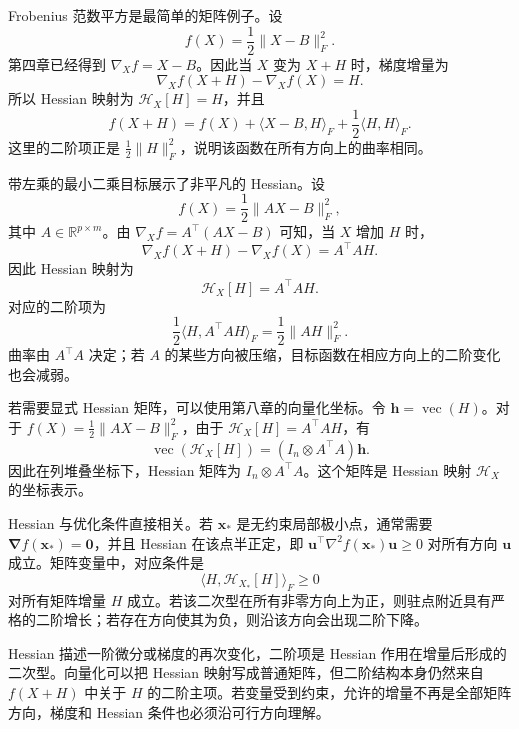 Frobenius 范数平方是最简单的矩阵例子。设
\[
f(X)=\frac12\|X-B\|_F^2.
\]
第四章已经得到 \(\nabla_X f=X-B\)。因此当 \(X\) 变为 \(X+H\) 时，梯度增量为
\[
\nabla_X f(X+H)-\nabla_X f(X)=H.
\]
所以 Hessian 映射为 \(\mathcal{H}_X[H]=H\)，并且
\[
f(X+H)=f(X)+\langle X-B,H\rangle_F+\frac12\langle H,H\rangle_F.
\]
这里的二阶项正是 \(\frac12\|H\|_F^2\)，说明该函数在所有方向上的曲率相同。

带左乘的最小二乘目标展示了非平凡的 Hessian。设
\[
f(X)=\frac12\|AX-B\|_F^2,
\]
其中 \(A\in\mathbb{R}^{p\times m}\)。由 \(\nabla_X f=A^\top(AX-B)\) 可知，当 \(X\) 增加 \(H\) 时，
\[
\nabla_X f(X+H)-\nabla_X f(X)=A^\top A H.
\]
因此 Hessian 映射为
\[
\mathcal{H}_X[H]=A^\top A H.
\]
对应的二阶项为
\[
\frac12\langle H,A^\top A H\rangle_F=\frac12\|AH\|_F^2.
\]
曲率由 \(A^\top A\) 决定；若 \(A\) 的某些方向被压缩，目标函数在相应方向上的二阶变化也会减弱。

若需要显式 Hessian 矩阵，可以使用第八章的向量化坐标。令 \(\bm{h}=\operatorname{vec}(H)\)。对于 \(f(X)=\frac12\|AX-B\|_F^2\)，由于 \(\mathcal{H}_X[H]=A^\top A H\)，有
\[
\operatorname{vec}(\mathcal{H}_X[H])=(I_n\otimes A^\top A)\bm{h}.
\]
因此在列堆叠坐标下，Hessian 矩阵为 \(I_n\otimes A^\top A\)。这个矩阵是 Hessian 映射 \(\mathcal{H}_X\) 的坐标表示。

Hessian 与优化条件直接相关。若 \(\bm{x}_\ast\) 是无约束局部极小点，通常需要 \(\bm{\nabla} f(\bm{x}_\ast)=\bm{0}\)，并且 Hessian 在该点半正定，即 \(\bm{u}^\top\nabla^2 f(\bm{x}_\ast)\bm{u}\ge0\) 对所有方向 \(\bm{u}\) 成立。矩阵变量中，对应条件是
\[
\langle H,\mathcal{H}_{X_\ast}[H]\rangle_F\ge0
\]
对所有矩阵增量 \(H\) 成立。若该二次型在所有非零方向上为正，则驻点附近具有严格的二阶增长；若存在方向使其为负，则沿该方向会出现二阶下降。

Hessian 描述一阶微分或梯度的再次变化，二阶项是 Hessian 作用在增量后形成的二次型。向量化可以把 Hessian 映射写成普通矩阵，但二阶结构本身仍然来自 \(f(X+H)\) 中关于 \(H\) 的二阶主项。若变量受到约束，允许的增量不再是全部矩阵方向，梯度和 Hessian 条件也必须沿可行方向理解。
